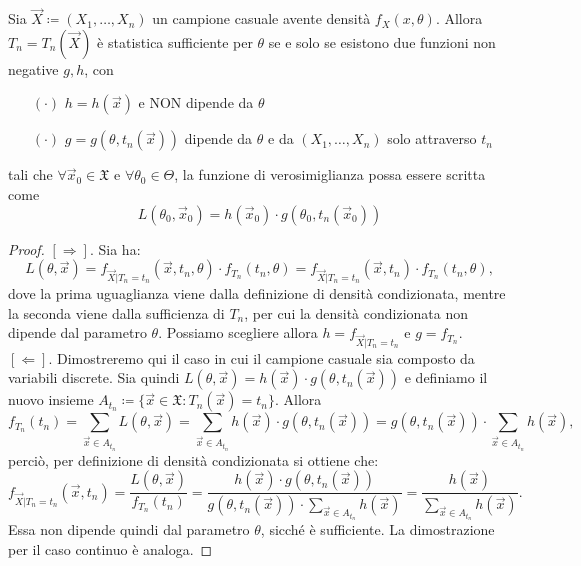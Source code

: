 \begin{teo}  Sia $\vec{X}\coloneqq (X_1,\ldots,X_n)$ un campione casuale avente densità $f_X(x,\theta)$. Allora $T_n=T_n(\vec{X})$ è statistica sufficiente per $\theta$ se e solo se esistono due funzioni non negative $g,h$, con
\begin{enumerate}
\item[$(\cdot)$] $h=h(\vec{x})$ e NON dipende da $\theta$
\item[$(\cdot)$] $g=g(\theta, t_n(\vec{x}))$ dipende da $\theta$ e da  $(X_1,\ldots,X_n)$ solo attraverso $t_n$
 \end{enumerate}
tali che $\forall \vec{x}_0\in \mathfrak{X}$ e $\forall \theta_0\in \Theta$, la funzione di verosimiglianza possa essere scritta come $$L(\theta_0,\vec{x}_0)=h(\vec{x}_0)\cdot g(\theta_0, t_n(\vec{x}_0))$$
\end{teo}

\begin{proof}
$[\Rightarrow].$ Sia ha:
$$L(\theta,\vec{x})=f_{\vec{X}|T_n=t_n}(\vec{x},t_n,\theta)\cdot f_{T_n}(t_n,\theta)=f_{\vec{X}|T_n=t_n}(\vec{x},t_n)\cdot f_{T_n}(t_n,\theta),$$
dove la prima uguaglianza viene dalla definizione di densità condizionata, mentre la seconda viene dalla sufficienza di $T_n$, per cui la densità condizionata non dipende dal parametro $\theta.$ Possiamo scegliere allora $h=f_{\vec{X}|T_n=t_n}$ e $g=f_{T_n}$. 
\\
$[\Leftarrow].$ Dimostreremo qui il caso in cui il campione casuale sia composto da variabili discrete. Sia quindi $L(\theta,\vec{x})=h(\vec{x})\cdot g(\theta, t_n(\vec{x}))$ e definiamo il nuovo insieme $A_{t_n}\coloneqq \{\vec{x}\in \mathfrak{X}:T_n(\vec{x})=t_n\}$. Allora
$$f_{T_n}(t_n)=\sum_{\vec{x}\in A_{t_n}} L(\theta,\vec{x})=\sum_{\vec{x}\in A_{t_n}} h(\vec{x})\cdot g(\theta, t_n(\vec{x}))=g(\theta, t_n(\vec{x}))\cdot \sum_{\vec{x}\in A_{t_n}} h(\vec{x}),$$
perciò, per definizione di densità condizionata si ottiene che:
$$f_{\vec{X}|T_n=t_n}(\vec{x},t_n)=\frac{L(\theta,\vec{x})}{f_{T_n}(t_n)}=\frac{h(\vec{x})\cdot g(\theta, t_n(\vec{x}))}{g(\theta, t_n(\vec{x}))\cdot \sum_{\vec{x}\in A_{t_n}} h(\vec{x})}=\frac{h(\vec{x})}{\sum_{\vec{x}\in A_{t_n}} h(\vec{x})}.$$
Essa non dipende quindi dal parametro $\theta$, sicché è sufficiente. La dimostrazione per il caso continuo è analoga.

\end{proof}
